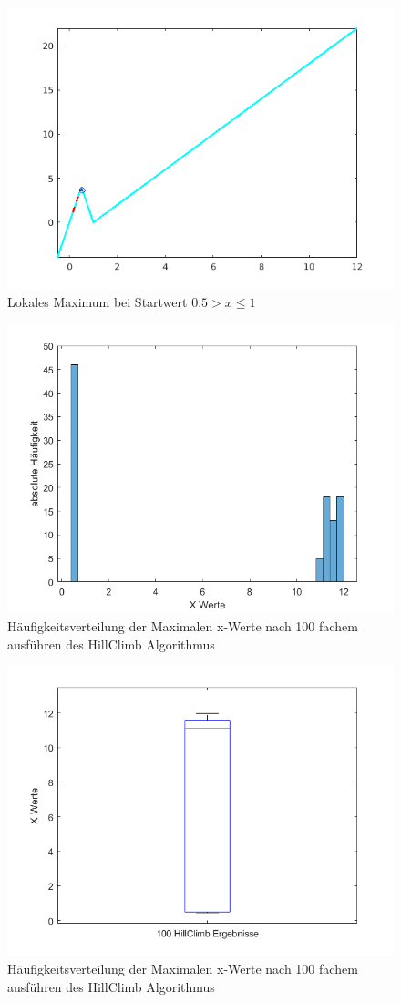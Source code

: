 \documentclass{hbrs-ecta-report}
\begin{document}
\begin{figure}[t]
	\includegraphics[width=\linewidth]{img/plot_fit_local_max_left.png}
	\caption{Lokales Maximum bei Startwert  $0.5 > x\leq1$ }
	\label{fig:fit_local_max_left} 
\end{figure}
\begin{figure}[p]
	\includegraphics[width=\linewidth]{img/histogram_of_100_HillClimbs.png}
	\caption{Häufigkeitsverteilung der Maximalen x-Werte nach 100 fachem ausführen des HillClimb Algorithmus}
	\label{fig:histogram} 
\end{figure}
\begin{figure}[p]
	\includegraphics[width=\linewidth]{img/Boxplot_of_100HillClimbs.png}
	\caption{Häufigkeitsverteilung der Maximalen x-Werte nach 100 fachem ausführen des HillClimb Algorithmus}
	\label{fig:boxplot} 
\end{figure}
\end{document}
